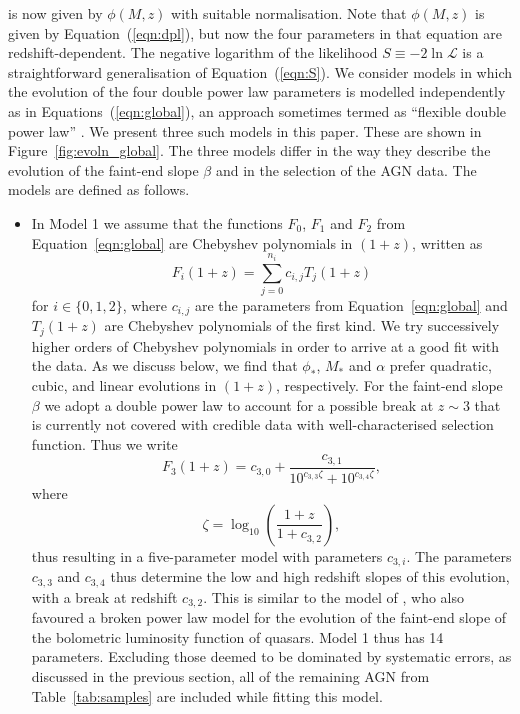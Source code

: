 \documentclass[fleqn,usenatbib]{mnras}
\newcommand{\new}[1]{{\color{notecolor} #1}}
\begin{document}
is now given by $\phi(M,z)$ with suitable normalisation.  Note that
$\phi(M,z)$ is given by Equation~(\ref{eqn:dpl}), but now the four
parameters in that equation are redshift-dependent.  The negative
logarithm of the likelihood $S\equiv -2\ln\mathcal{L}$ is a
straightforward generalisation of Equation~(\ref{eqn:S}).  We consider
models in which the evolution of the four double power law parameters
is modelled independently as in Equations~(\ref{eqn:global}), an
approach sometimes termed as ``flexible double power law''
\citep{2015MNRAS.451.1892A}.  We present three such models in this
paper.  These are shown in Figure~\ref{fig:evoln_global}.  The three
models differ in the way they describe the evolution of the faint-end
slope $\beta$ and in the selection of the AGN data.  The models are
defined as follows.

\begin{itemize}

\item
  In Model 1 we assume that the functions $F_0$, $F_1$ and $F_2$ from
  Equation~\eqref{eqn:global} are Chebyshev polynomials in
  $\left(1+z\right)$, written as
  \begin{equation}
    F_i\left(1+z\right)=\sum_{j=0}^{n_i}c_{i,j}T_j\left(1+z\right)
    \label{eqn:cbs}
  \end{equation}
  for $i\in\{0,1,2\}$, where $c_{i,j}$ are the parameters from
  Equation~\eqref{eqn:global} and $T_j\left(1+z\right)$ are Chebyshev
  polynomials of the first kind. We try successively higher orders of
  Chebyshev polynomials in order to arrive at a good fit with the
  data.  As we discuss below, we find that $\phi_*$, $M_*$ and
  $\alpha$ prefer quadratic, cubic, and linear evolutions in
  $\left(1+z\right)$, respectively.  For the faint-end slope $\beta$
  we adopt a double power law to account for a possible break at
  $z\sim 3$ that is currently not covered with credible data \new{with
    well-characterised selection function}.  Thus we write
  \begin{equation}
    F_3\left(1+z\right)=c_{3,0}+\frac{c_{3,1}}{10^{c_{3,3}\zeta}+10^{c_{3,4}\zeta}},
    \label{eqn:beta}
  \end{equation}
  where
  \begin{equation}
    \zeta = \log_{10}\left(\frac{1+z}{1+c_{3,2}}\right),
  \end{equation}
  thus resulting in a five-parameter model with parameters $c_{3,i}$.
  The parameters $c_{3,3}$ and $c_{3,4}$ thus determine the low and
  high redshift slopes of this evolution, with a break at redshift
  $c_{3,2}$.  This is similar to the model of
  \citet{2007ApJ...654..731H}, who also favoured a broken power law
  model for the evolution of the faint-end slope of the bolometric
  luminosity function of quasars.  Model 1 thus has 14 parameters.
  Excluding those deemed to be dominated by systematic errors, as
  discussed in the previous section, all of the remaining AGN from
  Table~\ref{tab:samples} are included while fitting this model.


\end{itemize}
\end{document}
